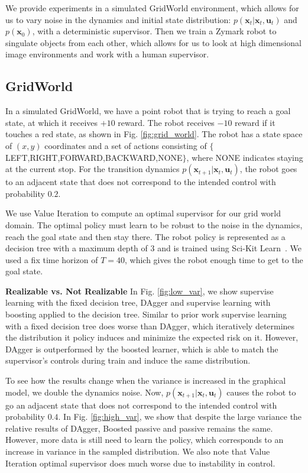 \documentclass[10pt, conference]{ieeeconf}      %
\newcommand{\bu}{\mathbf{u}}
\newcommand{\bx}{\mathbf{x}}
\begin{document}
We provide experiments in a simulated GridWorld environment, which allows for us to vary noise in the dynamics and initial state distribution: $p(\bx_t|\bx_t,\bu_t)$ and $p(\bx_0)$, with a deterministic supervisor. Then we  train a Zymark robot to singulate objects from each other, which allows for us to look at high dimensional image environments and work with a human supervisor. 
\subsection{GridWorld}\label{sec:gdw}
In a simulated GridWorld, we have a point robot that is trying to reach a goal state, at which it receives $+10$ reward. The robot receives $-10$ reward if it touches a red state, as shown in Fig. \ref{fig:grid_world}. The robot has a state space of $(x,y)$ coordinates and a set of actions consisting of $\lbrace$LEFT,RIGHT,FORWARD,BACKWARD,NONE$\rbrace$, where NONE indicates staying at the current stop. For the transition dynamics $p(\bx_{t+1}|\bx_{t},\bu_t)$, the robot goes to an adjacent state that does not correspond to the intended control with probability $0.2$. 

We use Value Iteration to compute an optimal supervisor for our grid world domain. The optimal policy must learn to be robust to the noise in the dynamics, reach the goal state and then stay there. The robot policy is represented as a decision tree with a maximum depth of $3$ and is trained using Sci-Kit Learn~\cite{scikit-learn}. We used a fix time horizon of $T=40$, which gives the robot enough time to get to the goal state. 


\noindent \textbf{Realizable vs. Not Realizable} In Fig. \ref{fig:low_var}, we show supervise learning with the fixed decision tree, DAgger and supervise learning with boosting applied to the decision tree. Similar to prior work supervise learning with a fixed decision tree does worse than DAgger, which iteratively determines the distribution it policy induces and minimize the expected risk on it. However, DAgger is outperformed by the boosted learner, which is able to match the supervisor's controls during train and induce the same distribution. 

To see how the results change when the variance is increased in the graphical model, we double the dynamics noise. Now, $p(\bx_{t+1}|\bx_t,\bu_t)$ causes the robot to go an adjacent state that does not correspond to the intended control with probability $0.4$. In Fig. \ref{fig:high_var}, we show that despite the large variance the relative results of DAgger, Boosted passive and passive remains the same. However, more data is still need to learn the policy, which corresponds to an increase in variance in the sampled distribution. We also note that Value Iteration optimal supervisor does much worse due to instability in control. 
\end{document}
